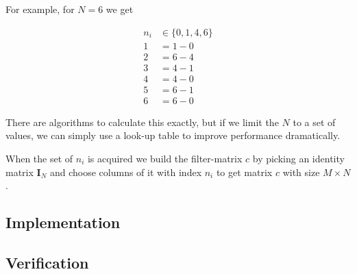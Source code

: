 \documentclass[report, oneside, a4paper, openany]{memoir}
\begin{document}
For example, for $N=6$ we get

\begin{align}
n_i&\in\{0,1,4,6\}\\
1 &= 1-0\\
2 &= 6-4\\
3 &= 4-1\\
4 &= 4-0\\
5 &= 6-1\\
6 &= 6-0
\end{align}


There are algorithms to calculate this exactly, but if we limit the $N$ to a set of values, we can simply use a look-up table to improve performance dramatically.

When the set of $n_i$ is acquired we build the filter-matrix $c$ by picking an identity matrix $\mathbf{I}_N$ and choose columns of it with index $n_i$ to get matrix $c$ with size $M \times N$.

\subsection{Implementation}

\subsection{Verification}
\end{document}
